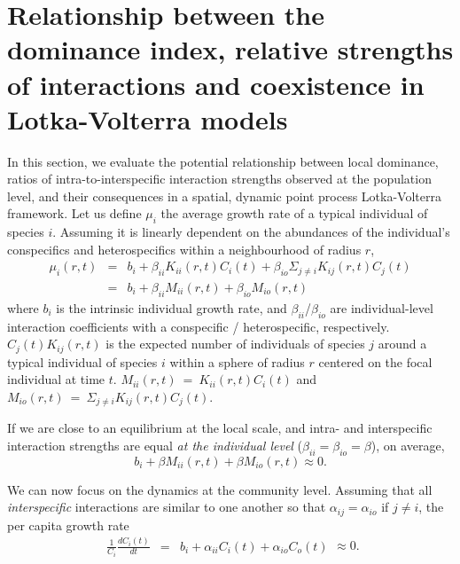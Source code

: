 \documentclass[english]{article}
\begin{document}
\section{Relationship between the dominance index, relative strengths of interactions
and coexistence in Lotka-Volterra models}

In this section, we evaluate the potential relationship between local
dominance, ratios of intra-to-interspecific interaction strengths
observed at the population level, and their consequences in a spatial,
dynamic point process Lotka-Volterra framework. Let us define $\mu_{i}$
the average growth rate of a typical individual of species $i$. Assuming
it is linearly dependent on the abundances of the individual's conspecifics
and heterospecifics within a neighbourhood of radius $r$,
\begin{equation}
\begin{array}{ccc}
\mu_{i}(r,t) & = & b_{i}+\beta_{ii}K_{ii}(r,t)C_{i}(t)+\beta_{io}\Sigma_{j\neq i}K_{ij}(r,t)C_{j}(t)\\
 & = & b_{i}+\beta_{ii}M_{ii}(r,t)+\beta_{io}M_{io}(r,t)
\end{array}\label{eq:lv_individual}
\end{equation}
where $b_{i}$ is the intrinsic individual growth rate, and $\beta_{ii}$/$\beta_{io}$
are individual-level interaction coefficients with a conspecific /
heterospecific, respectively. $C_{j}(t)K_{ij}(r,t)$ is the expected
number of individuals of species $j$ around a typical individual
of species $i$ within a sphere of radius $r$ centered on the focal
individual at time $t$. $M_{ii}(r,t)~=~K_{ii}(r,t)C_{i}(t)$ and $M_{io}(r,t)~=~\Sigma_{j\neq i}K_{ij}(r,t)C_{j}(t)$.

If we are close to an equilibrium at the local scale, and intra- and
interspecific interaction strengths are equal \textit{at the individual
level} ($\beta_{ii}=\beta_{io}=\beta$), on average,
\begin{equation}
b_{i}+\beta M_{ii}(r,t)+\beta M_{io}(r,t)\approx0.\label{eq:lv_individual_equilibrium}
\end{equation}

\medskip{}

We can now focus on the dynamics at the community level. Assuming
that all \emph{interspecific} interactions are similar to one another
so that $\alpha_{ij}=\alpha_{io}$ if $j\neq i$, the per capita growth
rate
\begin{equation}
\begin{array}{ccc}
\frac{1}{C_{i}}\frac{dC_{i}(t)}{dt} & = & b_{i}+\alpha_{ii}C_{i}(t)+\alpha_{io}C_{o}(t)\end{array}\approx0.\label{eq:lv_population}
\end{equation}
\end{document}
